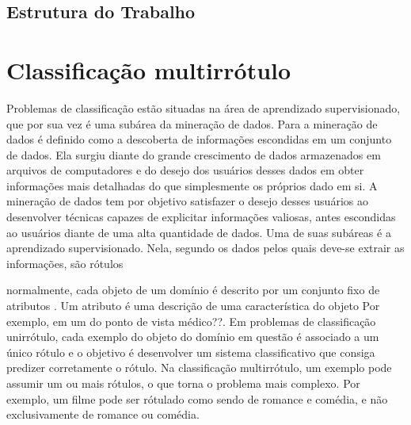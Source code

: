 \section{Estrutura do Trabalho}

\chapter{Classificação multirrótulo}

Problemas de classificação estão situadas na área de aprendizado supervisionado, que por sua vez é uma 
subárea da mineração de dados. Para \cite{dunham2003introductory} a mineração de dados é definido como a descoberta
de informações escondidas em um conjunto de dados. Ela surgiu diante do grande crescimento de dados armazenados
em arquivos de computadores e do desejo dos usuários desses dados em obter informações mais detalhadas do que simplesmente
os próprios dado em si. A mineração de dados tem por objetivo satisfazer o desejo desses usuários ao desenvolver técnicas
capazes de explicitar informações valiosas, antes escondidas ao usuários diante de uma alta quantidade de dados.
Uma de suas subáreas é a aprendizado supervisionado. Nela, segundo \cite{mohri2012foundations} os dados pelos quais deve-se extrair as informações, são 
rótulos

normalmente, cada objeto de um domínio é descrito por um conjunto fixo de atributos \cite{rezende2003sistemas}.
Um atributo é uma descrição de uma característica do objeto 
Por exemplo, em um do ponto de vista médico??.
Em problemas de classificação unirrótulo, cada exemplo do objeto do domínio em questão é associado 
a um único rótulo e o objetivo é desenvolver um sistema classificativo que consiga predizer corretamente
o rótulo. Na classificação multirrótulo, um exemplo pode assumir um ou mais rótulos, o que torna o problema mais complexo.
Por exemplo, um filme pode ser rótulado como sendo de romance e comédia, e não exclusivamente de romance ou comédia.



